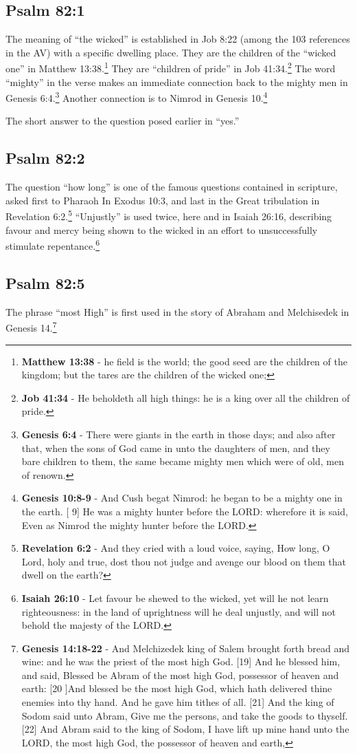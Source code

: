 \subsection{Psalm 82:1}
The meaning of ``the wicked'' is established in Job 8:22 (among the 103 references in the AV) with a specific dwelling place. They are the children of the ``wicked one'' in Matthew 13:38.\footnote{\textbf{Matthew 13:38} - he field is the world; the good seed are the children of the kingdom; but the tares are the children of the wicked one;} They are ``children of pride'' in Job 41:34.\footnote{\textbf{Job 41:34} - He beholdeth all high things: he is a king over all the children of pride.} The word ``mighty'' in the verse makes an immediate connection back to the mighty men in Genesis 6:4.\footnote{\textbf{Genesis 6:4} - There were giants in the earth in those days; and also after that, when the sons of God came in unto the daughters of men, and they bare children to them, the same became mighty men which were of old, men of renown.} Another connection is to Nimrod in Genesis 10.\footnote{\textbf{Genesis 10:8-9} - And Cush begat Nimrod: he began to be a mighty one in the earth. [ 9] He was a mighty hunter before the LORD: wherefore it is said, Even as Nimrod the mighty hunter before the LORD.}

The short answer to the question posed earlier in ``yes.'' 

\subsection{Psalm 82:2}
The question ``how long'' is one of the famous questions contained in scripture, asked first to Pharaoh In Exodus 10:3, and last in the Great tribulation in Revelation 6:2.\footnote{\textbf{Revelation 6:2} - And they cried with a loud voice, saying, How long, O Lord, holy and true, dost thou not judge and avenge our blood on them that dwell on the earth?} ``Unjustly'' is used twice, here and in Isaiah 26:16, describing favour and mercy being shown to the wicked in an effort to unsuccessfully stimulate repentance.\footnote{\textbf{Isaiah 26:10} - Let favour be shewed to the wicked, yet will he not learn righteousness: in the land of uprightness will he deal unjustly, and will not behold the majesty of the LORD.}

\subsection{Psalm 82:5}
The phrase ``most High'' is first used in the story of Abraham and Melchisedek in Genesis 14.\footnote{\textbf{Genesis 14:18-22} - And Melchizedek king of Salem brought forth bread and wine: and he was the priest of the most high God. [19] And he blessed him, and said, Blessed be Abram of the most high God, possessor of heaven and earth: [20 ]And blessed be the most high God, which hath delivered thine enemies into thy hand. And he gave him tithes of all. [21] And the king of Sodom said unto Abram, Give me the persons, and take the goods to thyself. [22] And Abram said to the king of Sodom, I have lift up mine hand unto the LORD, the most high God, the possessor of heaven and earth, }


